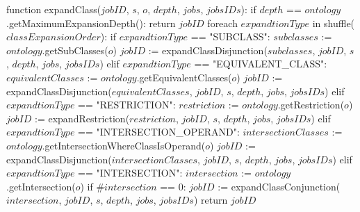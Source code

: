 function expandClass($jobID$, $s$, $o$, $depth$, $jobs$, $jobsIDs$):
    if $depth$ == $ontology$.getMaximumExpansionDepth():
        return $jobID$
    foreach $expandtionType$ in shuffle($classExpansionOrder$):
        if $expandtionType$ == "SUBCLASS":
            $subclasses$ := $ontology$.getSubClasses($o$)
            $jobID$ := expandClassDisjunction($subclasses$, $jobID$, $s$, $depth$, $jobs$, $jobsIDs$)
        elif $expandtionType$ == "EQUIVALENT_CLASS":
            $equivalentClasses$ := $ontology$.getEquivalentClasses($o$)
            $jobID$ := expandClassDisjunction($equivalentClasses$, $jobID$, $s$, $depth$, $jobs$, $jobsIDs$)
        elif $expandtionType$ == "RESTRICTION":
            $restriction$ := $ontology$.getRestriction($o$)
            $jobID$ := expandRestriction($restriction$, $jobID$, $s$, $depth$, $jobs$, $jobsIDs$)
        elif $expandtionType$ == "INTERSECTION_OPERAND":
            $intersectionClasses$ := $ontology$.getIntersectionWhereClassIsOperand($o$)   
            $jobID$ := expandClassDisjunction($intersectionClasses$, $jobID$, $s$, $depth$, $jobs$, $jobsIDs$)
        elif $expandtionType$ == "INTERSECTION":
            $intersection$ := $ontology$.getIntersection($o$)
            if $\#intersection$ == 0:
                $jobID$ := expandClassConjunction($intersection$, $jobID$, $s$, $depth$, $jobs$, $jobsIDs$)
    return $jobID$

